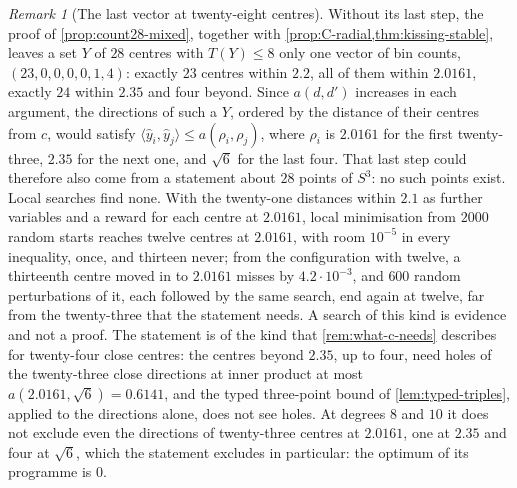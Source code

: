 \documentclass[11pt,reqno]{amsart}
\renewcommand{\_}{\origunderscore\allowbreak}
\numberwithin{equation}{section}
\theoremstyle{plain}
\theoremstyle{definition}
\theoremstyle{remark}
\newtheorem{remark}[thm]{Remark}
\begin{document}
\begin{remark}[The last vector at twenty-eight centres]\label{rem:count28-rest}
Without its last step, the proof of \cref{prop:count28-mixed}, together
with \cref{prop:C-radial,thm:kissing-stable}, leaves a set $Y$ of $28$
centres with $T(Y)\le8$ only one vector of bin counts,
$(23,0,0,0,0,1,4)$: exactly $23$ centres within $2.2$, all of them within
$2.0161$, exactly $24$ within $2.35$ and four beyond. Since
$a(d,d')$ increases in each argument, the directions of such a $Y$, ordered by
the distance of their centres from $c$, would satisfy
$\langle\hat y_i,\hat y_j\rangle\le a(\rho_i,\rho_j)$, where $\rho_i$ is
$2.0161$ for the first twenty-three, $2.35$
for the next one, and $\sqrt6$ for the last four. That last step could
therefore also come from a statement about $28$ points of $S^3$: no such
points exist. Local searches find none. With the
twenty-one distances within $2.1$ as further variables and a reward for each
centre at $2.0161$, local minimisation from $2000$ random starts reaches
twelve centres at $2.0161$, with room $10^{-5}$ in every inequality, once,
and thirteen never; from the configuration with twelve, a thirteenth centre
moved in to $2.0161$ misses by $4.2\cdot10^{-3}$, and $600$ random
perturbations of it, each followed by the same search, end again at
twelve, far from the twenty-three that the statement needs. A search of this
kind is evidence and not a proof. The statement is of the kind that
\cref{rem:what-c-needs} describes for twenty-four close centres: the
centres beyond $2.35$, up to four, need holes of the twenty-three close
directions at inner product at most $a(2.0161,\sqrt6)=0.6141$, and the typed three-point bound of
\cref{lem:typed-triples}, applied to the directions alone, does not see
holes. At degrees $8$ and $10$ it does not exclude even the directions of
twenty-three centres at $2.0161$, one at $2.35$ and four at $\sqrt6$, which
the statement excludes in particular: the optimum of its programme is $0$.


\end{remark}
\end{document}
